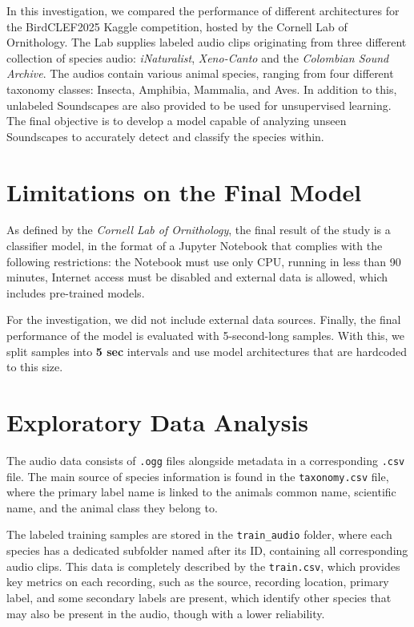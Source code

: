 \documentclass[10pt]{article}
\begin{document}
In this investigation, we compared the performance of different architectures for the BirdCLEF2025 Kaggle competition, hosted by the Cornell Lab of Ornithology. The Lab supplies labeled audio clips originating from three different collection of species audio: \textit{iNaturalist}, \textit{Xeno-Canto} and the \textit{Colombian Sound Archive}. The audios contain various animal species, ranging from four different taxonomy classes: Insecta, Amphibia, Mammalia, and Aves. In addition to this, unlabeled Soundscapes are also provided to be used for unsupervised learning. The final objective is to develop a model capable of analyzing unseen Soundscapes to accurately detect and classify the species within.

\section*{Limitations on the Final Model}

As defined by the \textit{Cornell Lab of Ornithology}, the final result of the study is a classifier model, in the format of a Jupyter Notebook that complies with the following restrictions: the Notebook must use only CPU, running in less than 90 minutes, Internet access must be disabled and external data is allowed, which includes pre-trained models.

For the investigation, we did not include external data sources. Finally, the final performance of the model is evaluated with 5-second-long samples. With this, we split samples into \textbf{5 sec} intervals and use model architectures that are hardcoded to this size.

\section*{Exploratory Data Analysis}

The audio data consists of \texttt{.ogg} files alongside metadata in a corresponding \texttt{.csv} file. The main source of species information is found in the \texttt{taxonomy.csv} file, where the primary label name is linked to the animals common name, scientific name, and the animal class they belong to.

The labeled training samples are stored in the \texttt{train\_audio} folder, where each species has a dedicated subfolder named after its ID, containing all corresponding audio clips. This data is completely described by the \texttt{train.csv}, which provides key metrics on each recording, such as the source, recording location, primary label, and some secondary labels are present, which identify other species that may also be present in the audio, though with a lower reliability.
\end{document}
